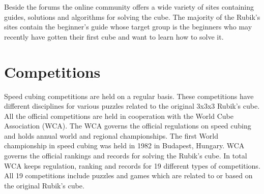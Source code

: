 Beside the forums the online community offers a wide variety of sites containing guides, solutions and algorithms for solving the cube. The majority of the Rubik's sites contain the beginner's guide\cite{jasminLee08} whose target group is the beginners who may recently have gotten their first cube and want to learn how to solve it. %

\section{Competitions}
\label{sec:wca}
Speed cubing competitions are held on a regular basis\cite{wca/competitions}. These competitions have different disciplines for various puzzles related to the original 3x3x3 Rubik's cube. All the official competitions are held in cooperation with the World Cube Association (WCA). The WCA governs the official regulations on speed cubing and holds annual world and regional championships. The first World championship in speed cubing was held in 1982 in Budapest, Hungary. WCA governs the official rankings and records for solving the Rubik's cube. In total WCA keeps regulation, ranking and records for 19 different types of competitions. All 19 competitions include puzzles and games which are related to or based on the original Rubik's cube. 
%